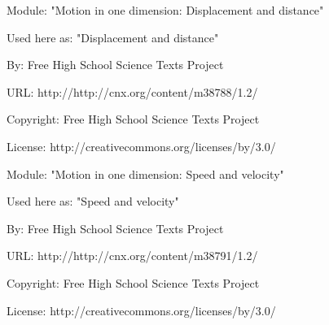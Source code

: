       \par\vspace{9pt}\noindent\begin{minipage}{\textwidth}
      Module: "Motion in one dimension: Displacement and distance" \par\nopagebreak\noindent
      Used here as: "Displacement and distance" \par\nopagebreak\noindent
        By: Free High School Science Texts Project\par\nopagebreak\noindent
      URL: http://http://cnx.org/content/m38788/1.2/\par\nopagebreak\noindent
      \par\nopagebreak\noindent
      Copyright: Free High School Science Texts Project\par\nopagebreak\noindent
      License:  http://creativecommons.org/licenses/by/3.0/\par\nopagebreak\noindent
      \par\end{minipage}
      \par\vspace{9pt}\noindent\begin{minipage}{\textwidth}
      Module: "Motion in one dimension: Speed and velocity" \par\nopagebreak\noindent
      Used here as: "Speed and velocity" \par\nopagebreak\noindent
        By: Free High School Science Texts Project\par\nopagebreak\noindent
      URL: http://http://cnx.org/content/m38791/1.2/\par\nopagebreak\noindent
      \par\nopagebreak\noindent
      Copyright: Free High School Science Texts Project\par\nopagebreak\noindent
      License:  http://creativecommons.org/licenses/by/3.0/\par\nopagebreak\noindent
      \par\end{minipage}
